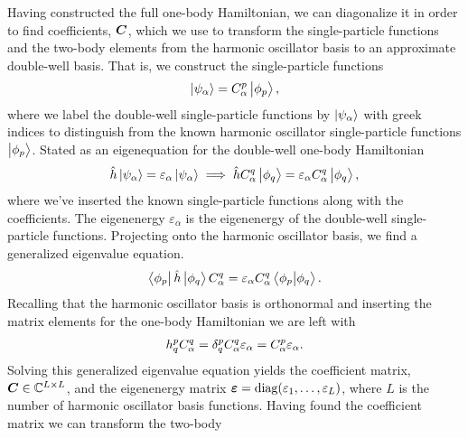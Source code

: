         Having constructed the full one-body Hamiltonian, we can diagonalize it
        in order to find coefficients, $\boldsymbol{C}$, which we use to transform the
        single-particle functions and the two-body elements from the harmonic
        oscillator basis to an approximate double-well basis.
        That is, we construct the single-particle functions
        \begin{align}
            \ket{\psi_{\alpha}} = C^{p}_{\alpha}\ket{\phi_p},
        \end{align}
        where we label the double-well single-particle functions by
        $\ket{\psi_{\alpha}}$ with greek indices to distinguish from the known
        harmonic oscillator single-particle functions $\ket{\phi_p}$.
        Stated as an eigenequation for the double-well one-body Hamiltonian
        \begin{gather}
            \hat{h} \ket{\psi_{\alpha}}
            = \varepsilon_{\alpha} \ket{\psi_{\alpha}}
            \implies
            \hat{h} C^{q}_{\alpha} \ket{\phi_q}
            = \varepsilon_{\alpha} C^{q}_{\alpha} \ket{\phi_q},
        \end{gather}
        where we've inserted the known single-particle functions along with the
        coefficients.
        The eigenenergy $\varepsilon_{\alpha}$ is the eigenenergy of the
        double-well single-particle functions.
        Projecting onto the harmonic oscillator basis, we find a generalized
        eigenvalue equation.
        \begin{gather}
            \bra{\phi_{p}}\hat{h}\ket{\phi_q} C^{q}_{\alpha}
            = \varepsilon_{\alpha} C^{q}_{\alpha} \braket{\phi_{p}}{\phi_{q}}.
        \end{gather}
        Recalling that the harmonic oscillator basis is orthonormal and
        inserting the matrix elements for the one-body Hamiltonian we are left
        with
        \begin{align}
            h^{p}_{q} C^{q}_{\alpha}
            = \delta^{p}_{q} C^{q}_{\alpha} \varepsilon_{\alpha}
            = C^{p}_{\alpha} \varepsilon_{\alpha}.
        \end{align}
        Solving this generalized eigenvalue equation yields the coefficient
        matrix, $\boldsymbol{C} \in \mathbb{C}^{L\times L}$, and the eigenenergy matrix
        $\boldsymbol{\varepsilon} = \operatorname{diag}(\varepsilon_1, \dots, \varepsilon_L)$, where
        $L$ is the number of harmonic oscillator basis functions.
        Having found the coefficient matrix we can transform the two-body
